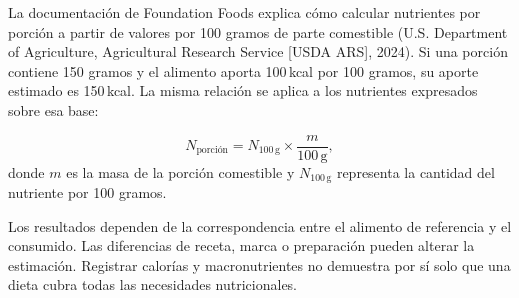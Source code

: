 La documentación de Foundation Foods explica cómo calcular nutrientes por porción a partir de valores por 100 gramos de parte comestible (U.S. Department of Agriculture, Agricultural Research Service [USDA ARS], 2024). Si una porción contiene 150 gramos y el alimento aporta 100\,kcal por 100 gramos, su aporte estimado es 150\,kcal. La misma relación se aplica a los nutrientes expresados sobre esa base:

\begin{equation}
    N_{\text{porción}}=N_{100\,\mathrm{g}}\times\frac{m}{100\,\mathrm{g}},
    \label{eq:nutrientes-porcion}
\end{equation}
donde $m$ es la masa de la porción comestible y $N_{100\,\mathrm{g}}$ representa la cantidad del nutriente por 100 gramos.

Los resultados dependen de la correspondencia entre el alimento de referencia y el consumido. Las diferencias de receta, marca o preparación pueden alterar la estimación. Registrar calorías y macronutrientes no demuestra por sí solo que una dieta cubra todas las necesidades nutricionales.
